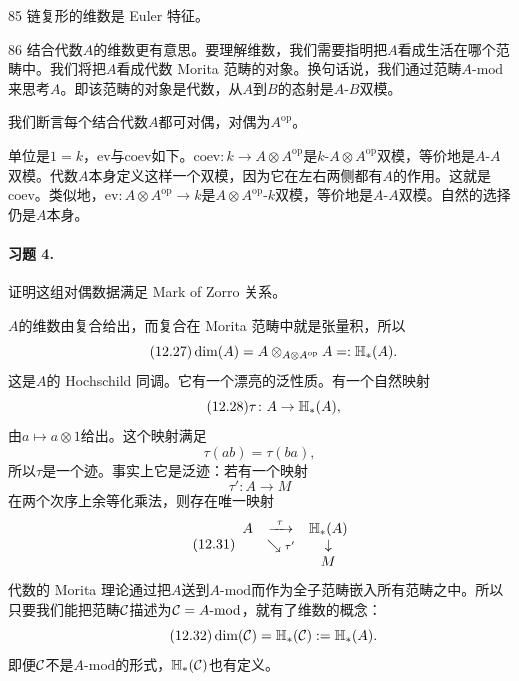 \begin{srcex}{85}
链复形的维数是 Euler 特征。
\end{srcex}

\begin{srcex}{86}
结合代数$A$的维数更有意思。要理解维数，我们需要指明把$A$看成生活在哪个范畴中。我们将把$A$看成代数 Morita 范畴的对象。换句话说，我们通过范畴$A\text{-}\mathrm{mod}$来思考$A$。即该范畴的对象是代数，从$A$到$B$的态射是$A$-$B$双模。
\end{srcex}

我们断言每个结合代数$A$都可对偶，对偶为$A^{\mathrm{op}}$。

单位是$1=k$，$\mathrm{ev}$与$\mathrm{coev}$如下。$\mathrm{coev}\colon k\to A\otimes A^{\mathrm{op}}$是$k$-$A\otimes A^{\mathrm{op}}$双模，等价地是$A$-$A$双模。代数$A$本身定义这样一个双模，因为它在左右两侧都有$A$的作用。这就是$\mathrm{coev}$。类似地，$\mathrm{ev}\colon A\otimes A^{\mathrm{op}}\to k$是$A\otimes A^{\mathrm{op}}$-$k$双模，等价地是$A$-$A$双模。自然的选择仍是$A$本身。

\paragraph{习题 4.}
证明这组对偶数据满足 Mark of Zorro 关系。

$A$的维数由复合给出，而复合在 Morita 范畴中就是张量积，所以
\begin{equation}\tag{12.27}
\dim(A)=A\otimes_{A\otimes A^{\mathrm{op}}}A=:\mathbb{H}_{*}(A).
\end{equation}
这是$A$的 Hochschild 同调。它有一个漂亮的泛性质。有一个自然映射
\begin{equation}\tag{12.28}
\tau\colon A\to\mathbb{H}_{*}(A),
\end{equation}
由$a\mapsto a\otimes 1$给出。这个映射满足
\begin{equation}\tag{12.29}
\tau(ab)=\tau(ba),
\end{equation}
所以$\tau$是一个迹。事实上它是泛迹：若有一个映射
\begin{equation}\tag{12.30}
\tau'\colon A\to M
\end{equation}
在两个次序上余等化乘法，则存在唯一映射
\begin{equation}\tag{12.31}
\begin{array}{ccc}
A & \xrightarrow{\ \tau\ } & \mathbb{H}_{*}(A)\\
 & \searrow{\scriptstyle \tau'} & \downarrow\\
 & & M
\end{array}
\end{equation}
代数的 Morita 理论通过把$A$送到$A\text{-}\mathrm{mod}$而作为全子范畴嵌入所有范畴之中。所以只要我们能把范畴$\mathcal{C}$描述为$\mathcal{C}=A\text{-}\mathrm{mod}$，就有了维数的概念：
\begin{equation}\tag{12.32}
\dim(\mathcal{C})=\mathbb{H}_{*}(\mathcal{C}):=\mathbb{H}_{*}(A).
\end{equation}
即便$\mathcal{C}$不是$A\text{-}\mathrm{mod}$的形式，$\mathbb{H}_{*}(\mathcal{C})$也有定义。

